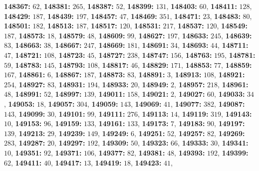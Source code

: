 \textsf{\bfseries 148367:} $62$, \textsf{\bfseries 148381:} $265$, \textsf{\bfseries 148387:} $52$, \textsf{\bfseries 148399:} $131$, \textsf{\bfseries 148403:} $60$, \textsf{\bfseries 148411:} $128$, \textsf{\bfseries 148429:} $187$, \textsf{\bfseries 148439:} $197$, \textsf{\bfseries 148457:} $47$, \textsf{\bfseries 148469:} $351$, \textsf{\bfseries 148471:} $23$, \textsf{\bfseries 148483:} $80$, \textsf{\bfseries 148501:} $182$, \textsf{\bfseries 148513:} $187$, \textsf{\bfseries 148517:} $120$, \textsf{\bfseries 148531:} $217$, \textsf{\bfseries 148537:} $120$, \textsf{\bfseries 148549:} $187$, \textsf{\bfseries 148573:} $18$, \textsf{\bfseries 148579:} $48$, \textsf{\bfseries 148609:} $99$, \textsf{\bfseries 148627:} $197$, \textsf{\bfseries 148633:} $245$, \textsf{\bfseries 148639:} $83$, \textsf{\bfseries 148663:} $38$, \textsf{\bfseries 148667:} $247$, \textsf{\bfseries 148669:} $181$, \textsf{\bfseries 148691:} $34$, \textsf{\bfseries 148693:} $44$, \textsf{\bfseries 148711:} $47$, \textsf{\bfseries 148721:} $108$, \textsf{\bfseries 148723:} $45$, \textsf{\bfseries 148727:} $238$, \textsf{\bfseries 148747:} $156$, \textsf{\bfseries 148763:} $195$, \textsf{\bfseries 148781:} $59$, \textsf{\bfseries 148783:} $145$, \textsf{\bfseries 148793:} $108$, \textsf{\bfseries 148817:} $46$, \textsf{\bfseries 148829:} $171$, \textsf{\bfseries 148853:} $77$, \textsf{\bfseries 148859:} $167$, \textsf{\bfseries 148861:} $6$, \textsf{\bfseries 148867:} $187$, \textsf{\bfseries 148873:} $83$, \textsf{\bfseries 148891:} $3$, \textsf{\bfseries 148913:} $108$, \textsf{\bfseries 148921:} $254$, \textsf{\bfseries 148927:} $83$, \textsf{\bfseries 148931:} $194$, \textsf{\bfseries 148933:} $20$, \textsf{\bfseries 148949:} $2$, \textsf{\bfseries 148957:} $218$, \textsf{\bfseries 148961:} $48$, \textsf{\bfseries 148991:} $52$, \textsf{\bfseries 148997:} $139$, \textsf{\bfseries 149011:} $158$, \textsf{\bfseries 149021:} $2$, \textsf{\bfseries 149027:} $60$, \textsf{\bfseries 149033:} $34$, \textsf{\bfseries 149053:} $18$, \textsf{\bfseries 149057:} $304$, \textsf{\bfseries 149059:} $143$, \textsf{\bfseries 149069:} $41$, \textsf{\bfseries 149077:} $382$, \textsf{\bfseries 149087:} $143$, \textsf{\bfseries 149099:} $30$, \textsf{\bfseries 149101:} $99$, \textsf{\bfseries 149111:} $276$, \textsf{\bfseries 149113:} $14$, \textsf{\bfseries 149119:} $319$, \textsf{\bfseries 149143:} $10$, \textsf{\bfseries 149153:} $96$, \textsf{\bfseries 149159:} $133$, \textsf{\bfseries 149161:} $133$, \textsf{\bfseries 149173:} $7$, \textsf{\bfseries 149183:} $90$, \textsf{\bfseries 149197:} $139$, \textsf{\bfseries 149213:} $29$, \textsf{\bfseries 149239:} $149$, \textsf{\bfseries 149249:} $6$, \textsf{\bfseries 149251:} $52$, \textsf{\bfseries 149257:} $82$, \textsf{\bfseries 149269:} $283$, \textsf{\bfseries 149287:} $20$, \textsf{\bfseries 149297:} $192$, \textsf{\bfseries 149309:} $50$, \textsf{\bfseries 149323:} $66$, \textsf{\bfseries 149333:} $30$, \textsf{\bfseries 149341:} $10$, \textsf{\bfseries 149351:} $92$, \textsf{\bfseries 149371:} $106$, \textsf{\bfseries 149377:} $82$, \textsf{\bfseries 149381:} $48$, \textsf{\bfseries 149393:} $192$, \textsf{\bfseries 149399:} $62$, \textsf{\bfseries 149411:} $40$, \textsf{\bfseries 149417:} $13$, \textsf{\bfseries 149419:} $18$, \textsf{\bfseries 149423:} $41$, 
